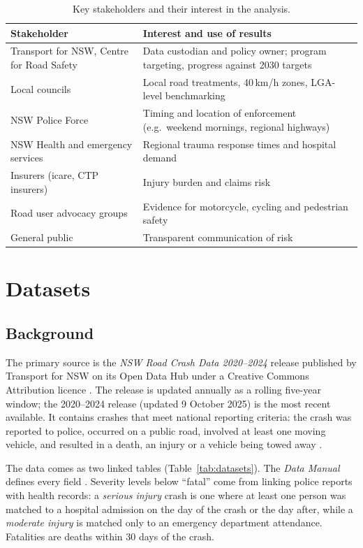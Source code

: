 \documentclass[11pt,a4paper]{article}
\begin{document}
\begin{table}[H]
\centering
\caption{Key stakeholders and their interest in the analysis.}
\label{tab:stakeholders}
\small
\begin{tabularx}{\textwidth}{@{}P{4.2cm}L@{}}
\toprule
\textbf{Stakeholder} & \textbf{Interest and use of results} \\
\midrule
Transport for NSW, Centre for Road Safety & Data custodian and policy owner; program targeting, progress against 2030 targets \\
Local councils & Local road treatments, 40\,km/h zones, LGA-level benchmarking \\
NSW Police Force & Timing and location of enforcement (e.g.\ weekend mornings, regional highways) \\
NSW Health and emergency services & Regional trauma response times and hospital demand \\
Insurers (icare, CTP insurers) & Injury burden and claims risk \\
Road user advocacy groups & Evidence for motorcycle, cycling and pedestrian safety \\
General public & Transparent communication of risk \\
\bottomrule
\end{tabularx}
\end{table}

\section{Datasets}
\label{sec:data}

\subsection{Background}
The primary source is the \emph{NSW Road Crash Data 2020--2024} release published by Transport for NSW on its
Open Data Hub under a Creative Commons Attribution licence \parencite{tfnsw_crashdata}. The release is
updated annually as a rolling five-year window; the 2020--2024 release (updated 9 October 2025) is the
most recent available. It contains crashes that meet national reporting criteria: the crash was reported to
police, occurred on a public road, involved at least one moving vehicle, and resulted in a death, an injury
or a vehicle being towed away \parencite{tfnsw_manual}.

The data comes as two linked tables (Table~\ref{tab:datasets}). The \emph{Data Manual} defines every field
\parencite{tfnsw_manual}. Severity levels below \enquote{fatal} come from linking police reports with health
records: a \emph{serious injury} crash is one where at least one person was matched to a hospital admission on
the day of the crash or the day after, while a \emph{moderate injury} is matched only to an emergency department
attendance. Fatalities are deaths within 30 days of the crash.
\end{document}
